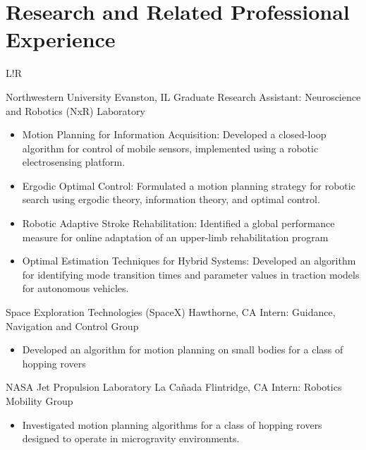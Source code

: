 \documentclass[10pt]{article}
\newcommand\VRule{\color{lightgray}\vrule width 0.5pt}
\newenvironment{cvlist}{
  \begin{itemize}[leftmargin=8 pt]
\vspace{-20 pt}
\renewcommand{\labelitemi}{-}
  \setlength{\itemsep}{0pt}
  \setlength{\parskip}{0pt}
  \setlength{\parsep}{0pt}
}{
\vspace{-10 pt}
  \end{itemize}
}
\newenvironment{cvtable}{
\vspace{-10 pt}
\begin{longtable}{L!{\VRule }R}
}{
\end{longtable}
}
\newcommand{\cvsect}[1]{
\vspace{-10  pt}
\section*{#1}
\vspace{-5 pt}
}
\begin{document}
\cvsect{Research and Related Professional Experience}
 \begin{cvtable}
{Northwestern University}%
{Evanston, IL}%
{Graduate Research Assistant: Neuroscience and Robotics (NxR) Laboratory }%
{\begin{cvlist}
  \item Motion Planning for Information Acquisition: Developed a
    closed-loop algorithm for control of mobile sensors, implemented
    using a robotic electrosensing platform.
  \item Ergodic Optimal Control: Formulated a motion planning strategy
    for robotic search using ergodic theory, information theory, and
    optimal control.
  \item Robotic Adaptive Stroke Rehabilitation: Identified a global
    performance measure for online adaptation of an upper-limb
    rehabilitation program
  \item Optimal Estimation Techniques for Hybrid Systems: Developed an
    algorithm for identifying mode transition times and parameter values
    in traction models for autonomous vehicles.
  \end{cvlist}}
% 
%
{Space Exploration Technologies (SpaceX)}%
{Hawthorne, CA}%
{Intern: Guidance, Navigation and Control Group}%
{\begin{cvlist}
  \item Developed an algorithm for motion planning on small bodies for a
    class of hopping
    rovers %
\end{cvlist}}
%
%
{NASA Jet Propulsion Laboratory}%
{La Cañada Flintridge, CA}%
{Intern: Robotics Mobility Group}%
{\begin{cvlist}
  \item Investigated motion planning algorithms for a class of hopping
    rovers designed to operate in microgravity
    environments. %
 \end{cvlist}}
%
%

\end{cvtable}
\end{document}
